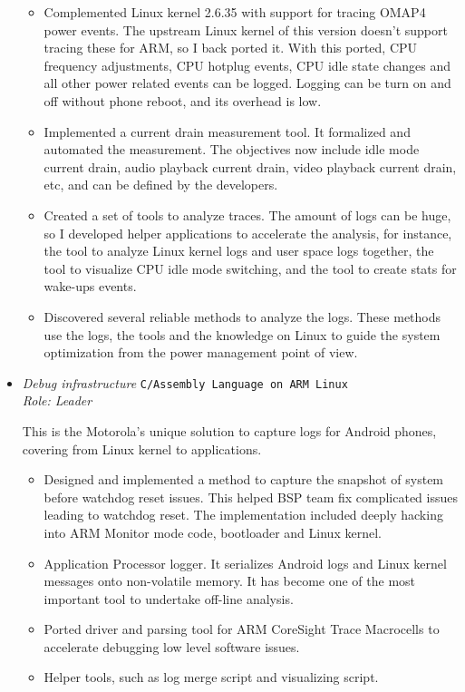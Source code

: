 \documentclass{res}
\begin{document}
\begin{resume}
\begin{itemize}
    \begin{itemize}
    \item Complemented Linux kernel 2.6.35 with support for tracing OMAP4 power events. The upstream Linux kernel of this version doesn't support tracing these for ARM, so I back ported it. With this ported, CPU frequency adjustments, CPU hotplug events, CPU idle state changes and all other power related events can be logged. Logging can be turn on and off without phone reboot, and its overhead is low.
    \item Implemented a current drain measurement tool. It formalized and automated the measurement. The objectives now include idle mode current drain, audio playback current drain, video playback current drain, etc, and can be defined by the developers. 
    \item Created a set of tools to analyze traces. The amount of logs can be huge, so I developed helper applications to accelerate the analysis, for instance, the tool to analyze Linux kernel logs and user space logs together, the tool to visualize CPU idle mode switching, and the tool to create stats for wake-ups events. 
    \item Discovered several reliable methods to analyze the logs. These methods use the logs, the tools and the knowledge on Linux to guide the system optimization from the power management point of view.
    \end{itemize}

  \item {\sl Debug infrastructure}                                   \hfill \texttt{C/Assembly Language on ARM Linux}\\
    {\sl Role: Leader}

    This is the Motorola's unique solution to capture logs for Android phones, covering from Linux kernel to applications.

    \begin{itemize}
    \item Designed and implemented a method to capture the snapshot of system before watchdog reset issues. This helped BSP team fix complicated issues leading to watchdog reset. The implementation included deeply hacking into ARM Monitor mode code, bootloader and Linux kernel.
    \item Application Processor logger. It serializes Android logs and Linux kernel messages onto non-volatile memory. It has become one of the most important tool to undertake off-line analysis.
    \item Ported driver and parsing tool for ARM CoreSight Trace Macrocells to accelerate debugging low level software issues.
    \item Helper tools, such as log merge script and visualizing script.
    \end{itemize}


\end{itemize}
\end{resume}
\end{document}
